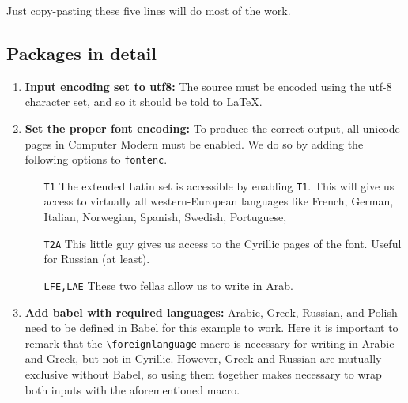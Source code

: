 \documentclass{article}
\begin{document}
Just copy-pasting these five lines will do most of the work.

\subsection{Packages in detail}
\begin{enumerate}
	\item \textbf{Input encoding set to utf8:} The source must be encoded using the utf-8 character set, and so it should be told to \LaTeX.

	\item \textbf{Set the proper font encoding:} To produce the correct output, all unicode pages in Computer Modern must be enabled.
	We do so by adding the following options to \texttt{fontenc}.
	\begin{itemize}
		\item[\texttt{T1}] The extended Latin set is accessible by enabling \texttt{T1}. This will give us access to virtually all western-European languages like French, German, Italian, Norwegian, Spanish, Swedish, Portuguese, 
		\item[\texttt{T2A}] This little guy gives us access to the Cyrillic pages of the font. Useful for Russian (at least).
		\item[\texttt{LFE,LAE}] These two fellas allow us to write in Arab.
	\end{itemize}

	\item \textbf{Add babel with required languages:} Arabic, Greek, Russian, and Polish need to be defined in Babel for this example to work.
	Here it is important to remark that the \texttt{\textbackslash{}foreignlanguage} macro is necessary for writing in Arabic and Greek, but not in Cyrillic.
	However, Greek and Russian are mutually exclusive without Babel, so using them together makes necessary to wrap both inputs with the aforementioned macro. 
\end{enumerate}
\end{document}
